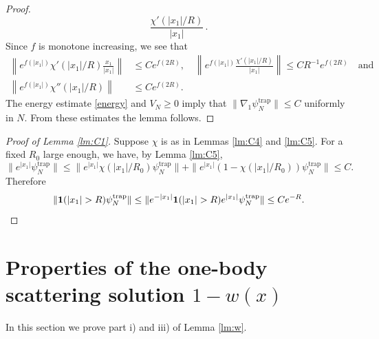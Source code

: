 \documentclass[11pt]{article}
\newcommand{\psitrap}{\psi_N^{\text{trap}}}
\begin{document}
\begin{proof}
\[\frac{\chi' (|x_1|/R)}{|x_1|} \,. \] Since $f$ is monotone
increasing, we see that \begin{equation} \begin{split} \left\| e^{f
(|x_1|)} \chi' (|x_1|/R) \frac{x_1}{|x_1|} \right\| &\leq C
e^{f(2R)},  \quad \left\|e^{f (|x_1|)} \frac{\chi' (|x_1|/R)}{|x_1|}
\right\| \leq C R^{-1} e^{f(2R)} \quad \text{and} \\ \left\| e^{f
(|x_1|)} \chi'' (|x_1|/R) \right\| &\leq C e^{f(2R)} .
\end{split}
\end{equation}
The energy estimate \eqref{energy} and $V_N\ge0$ imply that $\|
\nabla_1 \psitrap \| \leq C$ uniformly in $N$. From these estimates
the lemma follows.
\end{proof}

\begin{proof}[Proof of Lemma \ref{lm:C1}]
Suppose $\chi$ is as in Lemmas \ref{lm:C4} and \ref{lm:C5}. For a
fixed $R_0$ large enough, we have, by Lemma \ref{lm:C5},
\[ \| e^{|x_1|} \psitrap \| \leq \|e^{|x_1|} \chi (|x_1|/R_0)\psitrap
\| + \| e^{|x_1|} \left( 1 - \chi (|x_1|/R_0)\right) \psitrap \|
\leq C .\] Therefore
\[ \| {\bf 1}(|x_1| >R) \psitrap \| \leq \| e^{-|x_1|} {\bf 1} (|x_1| >
R) e^{|x_1|} \psitrap \| \leq C e^{-R} .\]
\end{proof}



\section{Properties of the one-body scattering solution
$1-w(x)$}\label{app:w} \setcounter{equation}{0}

In this section we prove part i) and iii) of Lemma \ref{lm:w}.
\end{document}
